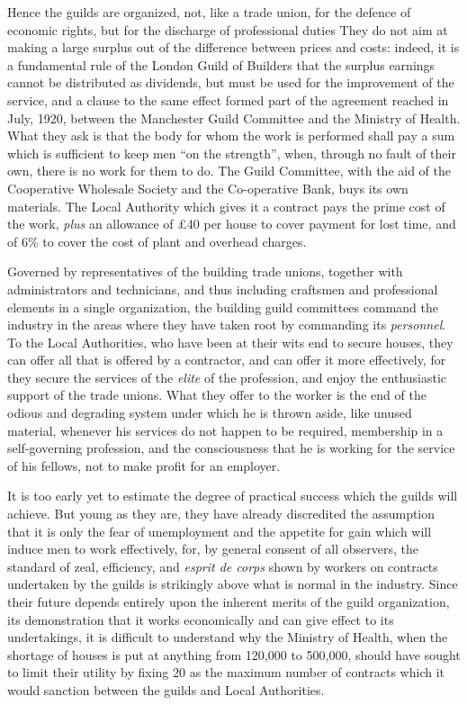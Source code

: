 \documentclass{book}
\begin{document}
Hence the guilds are organized, not, like a trade union, for the defence of economic rights, but for the discharge of professional duties They do not aim at making a large surplus out of the difference between prices and costs: indeed, it is a fundamental rule of the London Guild of Builders that the surplus earnings cannot be distributed as dividends, but must be used for the improvement of the service, and a clause to the same effect formed part of the agreement reached in July, 1920, between the Manchester Guild Committee and the Ministry of Health. What they ask is that the body for whom the work is performed shall pay a sum which is sufficient to keep men “on the strength”, when, through no fault of their own, there is no work for them to do. The Guild Committee, with the aid of the Cooperative Wholesale Society and the Co-operative Bank, buys its own materials. The Local Authority which gives it a contract pays the prime cost of the work, \emph{plus} an allowance of £40 per house to cover payment for lost time, and of 6\% to cover the cost of plant and overhead charges.

Governed by representatives of the building trade unions, together with administrators and technicians, and thus including craftsmen and professional elements in a single organization, the building guild committees command the industry in the areas where they have taken root by commanding its \emph{personnel}. To the Local Authorities, who have been at their wits end to secure houses, they can offer all that is offered by a contractor, and can offer it more effectively, for they secure the services of the \emph{elite} of the profession, and enjoy the enthusiastic support of the trade unions. What they offer to the worker is the end of the odious and degrading system under which he is thrown aside, like unused material, whenever his services do not happen to be required, membership in a self-governing profession, and the consciousness that he is working for the service of his fellows, not to make profit for an employer.

It is too early yet to estimate the degree of practical success which the guilds will achieve. But young as they are, they have already discredited the assumption that it is only the fear of unemployment and the appetite for gain which will induce men to work effectively, for, by general consent of all observers, the standard of zeal, efficiency, and \emph{esprit de corps} shown by workers on contracts undertaken by the guilds is strikingly above what is normal in the industry. Since their future depends entirely upon the inherent merits of the guild organization, its demonstration that it works economically and can give effect to its undertakings, it is difficult to understand why the Ministry of Health, when the shortage of houses is put at anything from 120,000 to 500,000, should have sought to limit their utility by fixing 20 as the maximum number of contracts which it would sanction between the guilds and Local Authorities.
\end{document}
